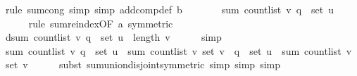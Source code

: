 \begin{isabellebody}
\ {\isacharparenleft}{\kern0pt}rule\ sum{\isachardot}{\kern0pt}cong{\isacharcomma}{\kern0pt}\ simp{\isacharcomma}{\kern0pt}\ simp\ add{\isacharcolon}{\kern0pt}comp{\isacharunderscore}{\kern0pt}def\ b{\isacharparenright}{\kern0pt}\isanewline
\ \ \isamarkupfalse%
\ \isamarkupfalse%
\ {\isachardoublequoteopen}{\isachardot}{\kern0pt}{\isachardot}{\kern0pt}{\isachardot}{\kern0pt}\ {\isacharequal}{\kern0pt}\ sum\ {\isacharparenleft}{\kern0pt}count{\isacharunderscore}{\kern0pt}list\ v{\isacharparenright}{\kern0pt}\ {\isacharparenleft}{\kern0pt}q\ {\isacharbackquote}{\kern0pt}\ set\ u{\isacharparenright}{\kern0pt}{\isachardoublequoteclose}\isanewline
\ \ \ \ \isamarkupfalse%
\ {\isacharparenleft}{\kern0pt}rule\ sum{\isachardot}{\kern0pt}reindex{\isacharbrackleft}{\kern0pt}OF\ a{\isacharcomma}{\kern0pt}\ symmetric{\isacharbrackright}{\kern0pt}{\isacharparenright}{\kern0pt}\isanewline
\ \ \isamarkupfalse%
\ \isamarkupfalse%
\ d{\isacharunderscore}{\kern0pt}{}{\isacharcolon}{\kern0pt}{\isachardoublequoteopen}sum\ {\isacharparenleft}{\kern0pt}count{\isacharunderscore}{\kern0pt}list\ v{\isacharparenright}{\kern0pt}\ {\isacharparenleft}{\kern0pt}q\ {\isacharbackquote}{\kern0pt}\ set\ u{\isacharparenright}{\kern0pt}\ {\isacharequal}{\kern0pt}\ length\ v{\isachardoublequoteclose}\isanewline
\ \ \ \ \isamarkupfalse%
\ simp\isanewline
\isanewline
\ \ \isamarkupfalse%
\ {\isachardoublequoteopen}sum\ {\isacharparenleft}{\kern0pt}count{\isacharunderscore}{\kern0pt}list\ v{\isacharparenright}{\kern0pt}\ {\isacharparenleft}{\kern0pt}q\ {\isacharbackquote}{\kern0pt}\ set\ u{\isacharparenright}{\kern0pt}\ {\isacharplus}{\kern0pt}\ sum\ {\isacharparenleft}{\kern0pt}count{\isacharunderscore}{\kern0pt}list\ v{\isacharparenright}{\kern0pt}\ {\isacharparenleft}{\kern0pt}set\ v\ {\isacharminus}{\kern0pt}\ {\isacharparenleft}{\kern0pt}q\ {\isacharbackquote}{\kern0pt}\ set\ u{\isacharparenright}{\kern0pt}{\isacharparenright}{\kern0pt}\ {\isacharequal}{\kern0pt}\ sum\ {\isacharparenleft}{\kern0pt}count{\isacharunderscore}{\kern0pt}list\ v{\isacharparenright}{\kern0pt}\ {\isacharparenleft}{\kern0pt}set\ v{\isacharparenright}{\kern0pt}{\isachardoublequoteclose}\isanewline
\ \ \ \ \isamarkupfalse%
\ {\isacharparenleft}{\kern0pt}subst\ sum{\isachardot}{\kern0pt}union{\isacharunderscore}{\kern0pt}disjoint{\isacharbrackleft}{\kern0pt}symmetric{\isacharbrackright}{\kern0pt}{\isacharcomma}{\kern0pt}\ simp{\isacharcomma}{\kern0pt}\ simp{\isacharcomma}{\kern0pt}\ simp{\isacharparenright}{\kern0pt}\isanewline

\end{isabellebody}
